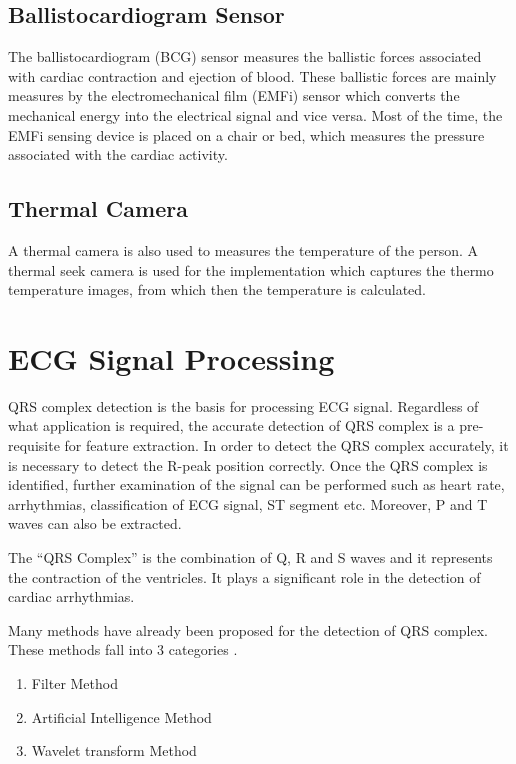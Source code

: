 \subsection{Ballistocardiogram Sensor}
The ballistocardiogram (BCG) sensor measures the ballistic forces associated with cardiac contraction and ejection of blood. These ballistic forces are mainly measures by the electromechanical film (EMFi) sensor which converts the mechanical energy into the electrical signal and vice versa. Most of the time, the EMFi sensing device is placed on a chair or bed, which measures the pressure associated with the cardiac activity.

\subsection{Thermal Camera}
A thermal camera is also used to measures the temperature of the person. A thermal seek camera is used for the implementation which captures the thermo temperature images, from which then the temperature is calculated.

\section{ECG Signal Processing}
QRS complex detection is the basis for processing ECG signal. Regardless of what application is required, the accurate detection of QRS complex is a pre-requisite for feature extraction. In order to detect the QRS complex accurately, it is necessary to detect the R-peak position correctly. Once the QRS complex is identified, further examination of the signal can be performed such as heart rate, arrhythmias, classification of ECG signal, ST segment etc. Moreover, P and T waves can also be extracted.

The ``QRS Complex'' is the combination of Q, R and S waves and it represents the contraction of the ventricles. It plays a significant role in the detection of cardiac arrhythmias.

Many methods have already been proposed for the detection of QRS complex. These methods fall into 3 categories \cite{5639905}.

\begin{enumerate}
	\item Filter Method
	\item Artificial Intelligence Method
	\item Wavelet transform Method
\end{enumerate}

